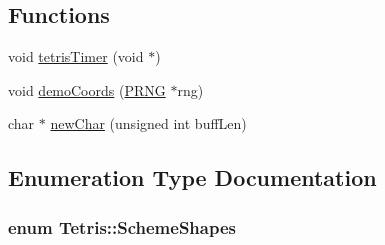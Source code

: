 \subsection*{Functions}
\begin{DoxyCompactItemize}
\item 
void \hyperlink{namespace_tetris_a0f7512df36d2c6482818a716e907b0e4}{tetris\-Timer} (void $\ast$)
\item 
void \hyperlink{namespace_tetris_a11e02a6ea968c826c44d3085dc4abc76}{demo\-Coords} (\hyperlink{class_k_base_1_1_p_r_n_g}{P\-R\-N\-G} $\ast$rng)
\item 
char $\ast$ \hyperlink{namespace_tetris_a86b5219dfac8ab2608bce144fd200a0a}{new\-Char} (unsigned int buff\-Len)
\end{DoxyCompactItemize}


\subsection{Enumeration Type Documentation}
\hypertarget{namespace_tetris_a3f476d631a010f1efba7b06db4ac7cc4}{
\subsubsection[{Scheme\-Shapes}]{\setlength{\rightskip}{0pt plus 5cm}enum {\bf Tetris\-::\-Scheme\-Shapes}}}\label{namespace_tetris_a3f476d631a010f1efba7b06db4ac7cc4}
